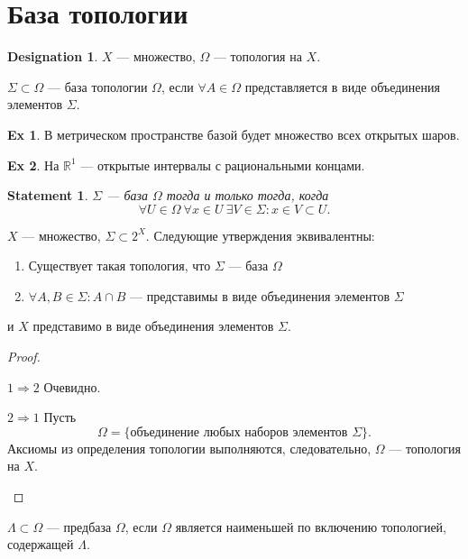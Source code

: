 \documentclass[11pt]{book}
\newcommand{\R}{\mathbb{R}}
\theoremstyle{definition}
\theoremstyle{plain}
\theoremstyle{plain}
\newtheorem*{st}{Statement}
\theoremstyle{definition}
\newtheorem*{ex}{Ex}
\newtheorem*{name}{Designation}
\theoremstyle{remark}
\begin{document}
\section{База топологии}
\begin{name}
    $ X$ --- множество,  $ \Omega $ --- топология на $ X$.
\end{name}
\begin{defn}
$ \Sigma \subset \Omega $ --- база топологии $ \Omega $, если $ \forall A \in \Omega $ представляется в виде объединения элементов $ \Sigma $.
\end{defn}
\begin{ex}
    В метрическом пространстве базой будет множество всех открытых шаров.
\end{ex}
\begin{ex}
    На $ \R^{1}$ --- открытые интервалы с рациональными концами.
\end{ex}
\begin{st}
    $ \Sigma  $ --- база $ \Omega $ тогда и только тогда, когда   \[
    \forall U \in \Omega ~ \forall x \in U ~ \exists V \in \Sigma: x \in V\subset U
    .\] 
\end{st}
\begin{thm}
    $ X$ --- множество,  $ \Sigma \subset 2^{X}$.
    Следующие утверждения эквивалентны:
    \begin{enumerate}
        \item Существует такая топология, что $ \Sigma $ --- база $ \Omega $
	\item $ \forall A, B \in \Sigma: A\cap B$ --- представимы в виде объединения элементов $ \Sigma$
    \end{enumerate}
    и $ X$ представимо в виде объединения элементов  $ \Sigma$.
\end{thm}
\begin{proof}
    $ $
    \begin{description}
	\item $ \boxed{ 1 \Longrightarrow 2}$ Очевидно.
	\item $ \boxed{ 2 \Longrightarrow 1}$ Пусть 
	     \[
	    \Omega = \{\text{объединение любых наборов элементов } \Sigma\}
	    .\] 
	    Аксиомы из определения топологии выполняются, следовательно, $ \Omega $ --- топология на $ X$.
    \end{description}
\end{proof}
\begin{defn}
    $ \Lambda \subset \Omega $ --- предбаза $ \Omega $, если $ \Omega $ является наименьшей по включению топологией, содержащей $ \Lambda$. 
\end{defn}
\end{document}
